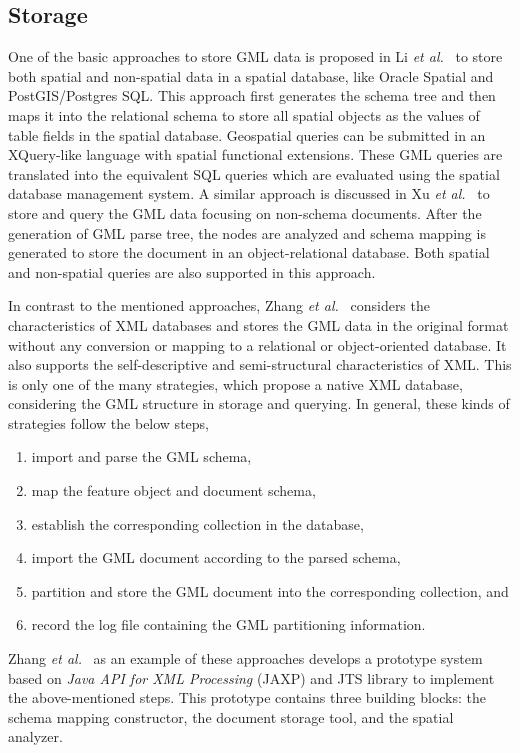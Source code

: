 \documentclass[a4paper,12pt]{article}
\begin{document}
\subsection{Storage}
\label{storage}
One of the basic approaches to store GML data is proposed in Li \emph{et al.}~\cite{Li2004} to store both spatial and non-spatial data in a spatial database, like Oracle Spatial and PostGIS/Postgres SQL. This approach first generates the schema tree and then maps it into the relational schema to store all spatial objects as the values of table fields in the spatial database. Geospatial queries can be submitted 
in an XQuery-like language with spatial functional extensions. These GML queries are translated into the equivalent SQL queries which are evaluated using the spatial database management system. 
A similar approach is discussed in Xu \emph{et al.}~\cite{Zhu2011} to store and query the GML data focusing on non-schema documents. After the generation of GML parse tree, the nodes are analyzed and schema mapping is generated to store the document in an object-relational database. 
Both spatial and non-spatial queries are also supported in this approach.

In contrast to the mentioned approaches, Zhang \emph{et al.}~\cite{Zhang2008} considers the characteristics of XML databases and stores the GML data in the original format without any conversion or mapping to a relational or object-oriented database. 
It also supports the self-descriptive and semi-structural characteristics of XML.
This is only one of the many strategies, which propose a native XML database, considering the GML structure in storage and querying. 
In general, these kinds of strategies follow the below steps,
\begin{enumerate}
\item import and parse the GML schema,
\item map the feature object and document schema,
\item establish the corresponding collection in the database,
\item import the GML document according to the parsed schema,
\item partition and store the GML document into the corresponding collection, and
\item record the log file containing the GML partitioning information.
\end{enumerate}
Zhang \emph{et al.}~\cite{Zhang2008} as an example of these approaches develops a prototype system based on \textit{Java API for XML Processing} (JAXP) and JTS library to implement the above-mentioned steps. 
This prototype contains three building blocks: the schema mapping constructor, the document storage tool, 
and the spatial analyzer.
\end{document}
